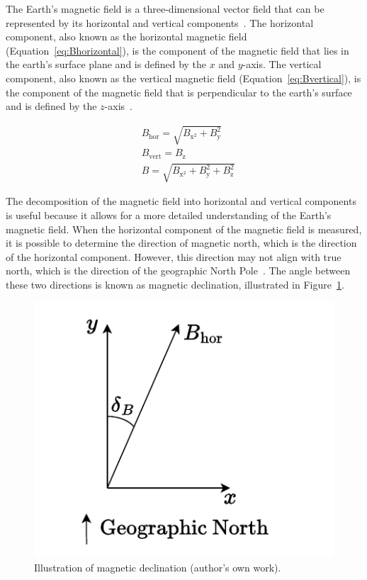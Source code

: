 \documentclass[DIV=14]{scrartcl}
\begin{document}
    The Earth's magnetic field is a three-dimensional vector field that can be represented by its horizontal and vertical components~\cite{labManual}.
    The horizontal component, also known as the horizontal magnetic field (Equation~\ref{eq:Bhorizontal}), is the component of the magnetic field
    that lies in the earth's surface plane and is defined by the $x$ and $y$-axis.
    The vertical component, also known as the vertical magnetic field (Equation~\ref{eq:Bvertical}), is the component of
    the magnetic field that is perpendicular to the earth's surface and is defined by the $z$-axis~\cite{labManual}.

    \begin{subequations}
        \begin{alignat}{1}
            & B_{\mathrm{hor}} = \sqrt{B_{\mathrm{x}^2} + B_{\mathrm{y}}^2} \label{eq:Bhorizontal}\\
            & B_{\mathrm{vert}} = B_{\mathrm{z}} \label{eq:Bvertical}\\
            & B = \sqrt{B_{\mathrm{x}^2} + B_{\mathrm{y}}^2 + B_{\mathrm{z}}^2}  \label{eq:Btotal}
        \end{alignat}
    \end{subequations}

    The decomposition of the magnetic field into horizontal and vertical components is useful because it
    allows for a more detailed understanding of the Earth's magnetic field.
    When the horizontal component of the magnetic field is measured, it is possible to determine the direction of
    magnetic north, which is the direction of the horizontal component.
    However, this direction may not align with true north, which is the direction of the geographic North Pole~\cite{CartographersOffice}.
    The angle between these two directions is known as magnetic declination, illustrated in Figure~\ref{fig:magneticDeclination}.

    \begin{figure}[!h]
        \centering
        \includegraphics[width=.3\textwidth]{figures/MagneticDeclination}
        \caption{Illustration of magnetic declination (author's own work).}
        \label{fig:magneticDeclination}
    \end{figure}
\end{document}
